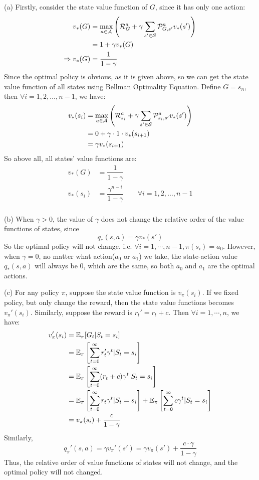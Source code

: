\begin{homeworkProblem}
(a) Firstly, consider the state value function of $G$, since it has only one action:
\begin{align*}
v_*(G) &= \max_{a\in\mathcal{A}}\left(\mathcal{R}_G^a + \gamma\sum_{s'\in\mathcal{S}}\mathcal{P}_{G,s'}^av_*(s')\right) \\
&= 1 + \gamma v_*(G) \\
\Rightarrow v_*(G) &= \dfrac{1}{1-\gamma}
\end{align*}
Since the optimal policy is obvious, as it is given above, so we can get the state value function of all states using Bellman Optimality Equation. Define $G=s_{n}$, then $\forall i=1,2,\ldots,n-1$, we have:
\begin{align*}
v_*(s_i) &= \max_{a\in\mathcal{A}}\left(\mathcal{R}_{s_i}^a + \gamma\sum_{s'\in\mathcal{S}}\mathcal{P}_{s_i,s'}^av_*(s')\right) \\
&= 0 + \gamma \cdot 1 \cdot v_*(s_{i+1}) \\
&= \gamma v_*(s_{i+1})
\end{align*}
So above all, all states' value functions are:
\begin{align*}
v_*(G) &= \dfrac{1}{1-\gamma} \\
v_*(s_i) &= \dfrac{\gamma^{n-i}}{1-\gamma} \qquad \forall i=1,2,\ldots,n-1 \\
\end{align*}

(b) When $\gamma > 0$, the value of $\gamma$ does not change the relative order of the value functions of states, since
$$q_*(s,a)=\gamma v_*(s')$$
So the optimal policy will not change. i.e. $\forall i=1,\cdots,n-1, \pi(s_i) = a_0$.
However, when $\gamma = 0$, no matter what action($a_0$ or $a_1$) we take, the state-action value $q_*(s,a)$ will always be $0$, which are the same, so both $a_0$ and $a_1$ are the optimal actions.

(c) For any policy $\pi$, suppose the state value function is $v_{\pi}(s_i)$. If we fixed policy, but only change the reward, then the state value functions becomes $v_{\pi}'(s_i)$. Similarly, suppose the reward is $r_t'=r_t+c$. Then $\forall i=1,\cdots, n$, we have:
\begin{align*}
v_{\pi}'(s_i) &= \mathbb{E}_{\pi}[G_t|S_t=s_i] \\
&= \mathbb{E}_{\pi}\left[\sum_{t=0}^{\infty}r_t' \gamma^t|S_t=s_i\right] \\
&= \mathbb{E}_{\pi}\left[\sum_{t=0}^{\infty}(r_t+c) \gamma^t|S_t=s_i\right] \\
&= \mathbb{E}_{\pi}\left[\sum_{t=0}^{\infty}r_t \gamma^t|S_t=s_i\right] + \mathbb{E}_{\pi}\left[\sum_{t=0}^{\infty}c \gamma^t|S_t=s_i\right] \\
& = v_{\pi}(s_i) + \frac{c}{1-\gamma}
\end{align*}
Similarly,
$$q_{\pi}'(s,a)=\gamma v_{\pi}'(s')=\gamma v_{\pi}(s') + \frac{c\cdot \gamma}{1-\gamma}$$
Thus, the relative order of value functions of states will not change, and the optimal policy will not changed.


\end{homeworkProblem}
